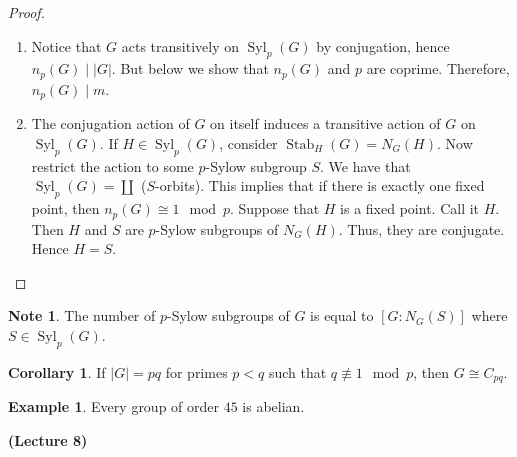 \documentclass[10pt,letterpaper,cm]{nupset}
\theoremstyle{definition}
\newtheorem{exmp}{Example}
\newtheorem{note}{Note}
\newtheorem{corollary}{Corollary}
\newcommand{\1}{\mathbf{1}}
\newcommand{\0}{\vec 0}
\DeclareMathOperator{\stab}{Stab}
\DeclareMathOperator{\Syl}{Syl}
\begin{document}
\begin{proof} $ $
\begin{enumerate}
\item Notice that $G$ acts transitively on $\Syl_p(G)$ by conjugation, hence $n_p(G) \mid |G|$. But below we show that $n_p(G)$ and $p$ are coprime. Therefore, $n_p(G) \mid m$.
\item The conjugation action of $G$ on itself induces a transitive action of $G$ on $\Syl_p(G)$. If $H \in \Syl_p(G)$, consider $\stab_H(G) = N_G(H)$. Now restrict the action to some $p$-Sylow subgroup $S$. We have  that $\Syl_p(G) = \coprod$ ($S$-orbits). This implies that if there is exactly one fixed point, then $n_p(G) \cong 1 \mod p$. Suppose that $H$ is a fixed point. Call it $H$. Then $H$ and $S$  are $p$-Sylow subgroups of $N_G(H)$. Thus, they are conjugate. Hence $H=S$.
\end{enumerate}
\end{proof}

\begin{note}
The number of $p$-Sylow subgroups of $G$ is equal to $[G : N_G(S)]$ where $S\in \Syl_p(G)$.
\end{note}

\begin{corollary}
If $|G| = pq$ for primes $p<q$ such that $q \not \equiv 1 \mod p$, then $G\cong C_{pq}$. 
\end{corollary}

\begin{exmp}
Every group of order $45$ is abelian.
\end{exmp}

\begin{center}
{\textbf{(Lecture 8)}}
\end{center}
\end{document}
